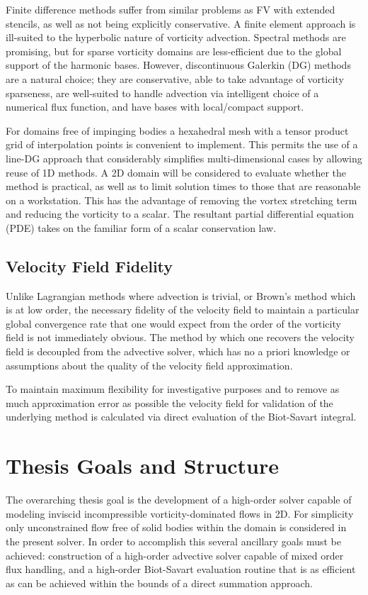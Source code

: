 \documentclass[letterpaper,12pt]{report}
\begin{document}
Finite difference methods suffer from similar problems as FV with extended stencils, as well as not being explicitly conservative. A finite element approach is ill-suited to the hyperbolic nature of vorticity advection. Spectral methods are promising, but for sparse vorticity domains are less-efficient due to the global support of the harmonic bases. However, discontinuous Galerkin (DG) methods \cite{HestWar} are a natural choice; they are conservative, able to take advantage of vorticity sparseness, are well-suited to handle advection via intelligent choice of a numerical flux function, and have bases with local/compact support.

For domains free of impinging bodies a hexahedral mesh with a tensor product grid of interpolation points is convenient to implement. This permits the use of a line-DG \cite{Persson2013} approach that considerably simplifies multi-dimensional cases by allowing reuse of 1D methods. A 2D domain will be considered to evaluate whether the method is practical, as well as to limit solution times to those that are reasonable on a workstation. This has the advantage of removing the vortex stretching term and reducing the vorticity to a scalar. The resultant partial differential equation (PDE) takes on the familiar form of a scalar conservation law.

\subsection{Velocity Field Fidelity}
Unlike Lagrangian methods where advection is trivial, or Brown's method which is at low order, the necessary fidelity of the velocity field to maintain a particular global convergence rate that one would expect from the order of the vorticity field is not immediately obvious. The method by which one recovers the velocity field is decoupled from the advective solver, which has no a priori knowledge or assumptions about the quality of the velocity field approximation. 

To maintain maximum flexibility for investigative purposes and to remove as much approximation error as possible the velocity field for validation of the underlying method is calculated via direct evaluation of the Biot-Savart integral.

\section{Thesis Goals and Structure}
The overarching thesis goal is the development of a high-order solver capable of modeling inviscid incompressible vorticity-dominated flows in 2D. For simplicity only unconstrained flow free of solid bodies within the domain is considered in the present solver. In order to accomplish this several ancillary goals must be achieved: construction of a high-order advective solver capable of mixed order flux handling, and a high-order Biot-Savart evaluation routine that is as efficient as can be achieved within the bounds of a direct summation approach.
\end{document}
